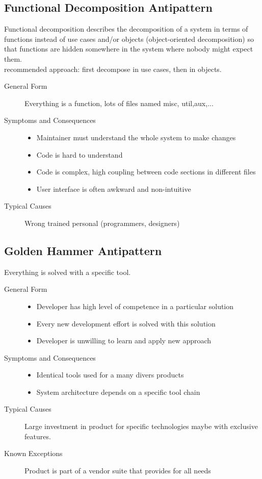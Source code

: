 \subsection{Functional Decomposition Antipattern}
Functional decomposition describes the decomposition of a system in terms of functions instead of use cases and/or objects (object-oriented decomposition) so that functions are hidden somewhere in the system where nobody might expect them.\\
recommended approach: first decompose in use cases, then in objects.
\begin{description}
  \item[General Form] Everything is a function, lots of files named misc, util,aux,...
  \item[Symptoms and Consequences] \hfill
  \begin{itemize}
    \item Maintainer must understand the whole system to make changes
     \item Code is hard to understand
     \item Code is complex, high coupling between code sections in different files
     \item User interface is often awkward and non-intuitive
  \end{itemize}
  \item[Typical Causes] Wrong trained personal (programmers, designers)
\end{description}
\newpage

\subsection{Golden Hammer Antipattern}
Everything is solved with a specific tool.
\begin{description}
  \item[General Form] \hfill
  \begin{itemize}
    \item Developer has high level of competence in a particular solution
    \item Every new development effort is solved with this solution
    \item Developer is unwilling to learn and apply new approach
  \end{itemize}
  \item[Symptoms and Consequences] \hfill
  \begin{itemize}
    \item Identical tools used for a many divers products
    \item System architecture depends on a specific tool chain
  \end{itemize}
  \item[Typical Causes] Large investment in product for specific technologies maybe with exclusive features.
  \item[Known Exceptions] Product is part of a vendor suite that provides for all needs
\end{description}
\newpage

